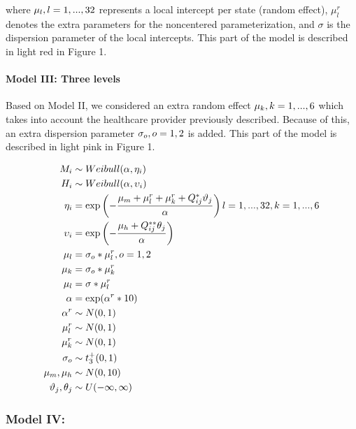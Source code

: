 \documentclass[10pt,letterpaper]{article}
\begin{document}
where \(\mu_l, \space l=1,...,32\) represents a local intercept per
state (random effect), \(\mu^r_l\) denotes the extra parameters for the
noncentered parameterization, and \(\sigma\) is the dispersion parameter
of the local intercepts. This part of the model is described in light
red in Figure 1.

\hypertarget{model-iii-three-levels}{%
\paragraph{Model III: Three levels}\label{model-iii-three-levels}}

Based on Model II, we considered an extra random effect
\(\mu_k, \space k=1,...,6\) which takes into account the healthcare
provider previously described. Because of this, an extra dispersion
parameter \(\sigma_o,\space o=1,2\) is added. This part of the model is
described in light pink in Figure 1.

\[
\begin{aligned}
 {M_i}  &\sim Weibull(\alpha,\eta_i)\\
 {H_i}  &\sim Weibull(\alpha,\upsilon_i) \\
 \eta_i &= \exp\left(-\frac{\mu_m+\mu_l^r+\mu_k^r+Q_{ij}^*\vartheta_{j}}{\alpha}\right)\space\space l=1,...,32,\space k=1,...,6 \\
 \upsilon_i &= \exp\left(-\frac{\mu_h+Q_{ij}^{**}\theta_{j}}{\alpha}\right) \\
 \mu_l&=\sigma_o*\mathbf{\mu}_l^r, \space\space o=1,2 \\
 \mu_k&=\sigma_o*\mathbf{\mu}_k^r \\
 \mu_l&=\sigma*\mathbf{\mu}_l^r \\
 \alpha&=\exp(\alpha^r*10) \\
 \alpha^r&\sim N(0,1) \\
 \mu^r_l&\sim N(0,1) \\
 \mu^r_k&\sim N(0,1) \\
 \sigma_o&\sim t^+_3(0,1) \\
 \mu_m,\mu_h &\sim N(0,10) \\
 \vartheta_j,\theta_j &\sim U(-\infty,\infty) \\
\end{aligned}
\]

\hypertarget{model-iv}{%
\subsubsection{Model IV:}\label{model-iv}}
\end{document}
